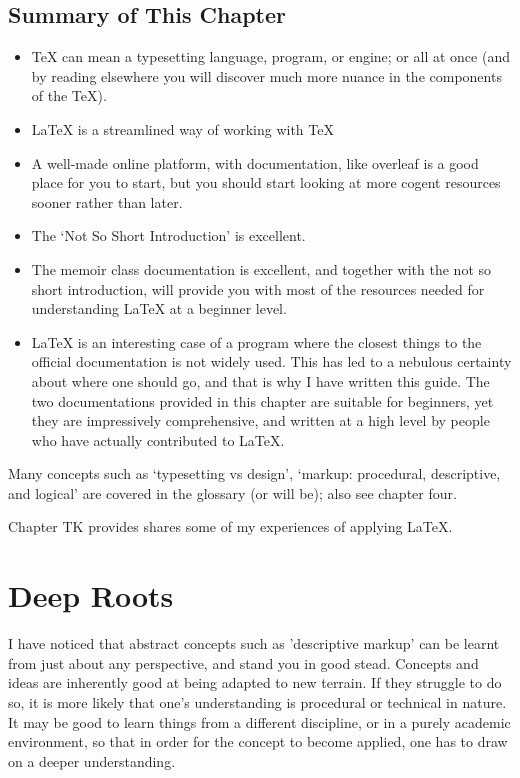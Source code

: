 \documentclass[12pt, oneside]{memoir}
\begin{document}
\section*{Summary of This Chapter}
\begin{itemize}
\item \TeX{} can mean a typesetting language, program, or engine; or all at once (and by reading elsewhere you will discover much more nuance in the components of the \TeX{}).
\item \LaTeX{} is a streamlined way of working with \TeX{} 
\item A well-made online platform, with documentation, like overleaf is a good place for you to start, but you should start looking at more cogent resources sooner rather than later.
\item The `Not So Short Introduction' is excellent.
\item The memoir class documentation is excellent, and together with the not so short introduction, will provide you with most of the resources needed for understanding \LaTeX{} at a beginner level.
\item \LaTeX{} is an interesting case of a program where the closest things to the official documentation is not widely used. This has led to a nebulous certainty about where one should go, and that is why I have written this guide. The two documentations provided in this chapter are suitable for beginners, yet they are impressively comprehensive, and written at a high level by people who have actually contributed to \LaTeX{}.
\end{itemize}

Many concepts such as `typesetting vs design', `markup: procedural, descriptive, and logical' are covered in the glossary (or will be); also see chapter four.

Chapter TK provides shares some of my experiences of applying \LaTeX{}.

\chapter{Deep Roots}

I have noticed that abstract concepts such as 'descriptive markup' can be learnt from just about any perspective, and stand you in good stead. Concepts and ideas are inherently good at being adapted to new terrain. If they struggle to do so, it is more likely that one's understanding is procedural or technical in nature. It may be good to learn things from a different discipline, or in a purely academic environment, so that in order for the concept to become applied, one has to draw on a deeper understanding.
\end{document}

